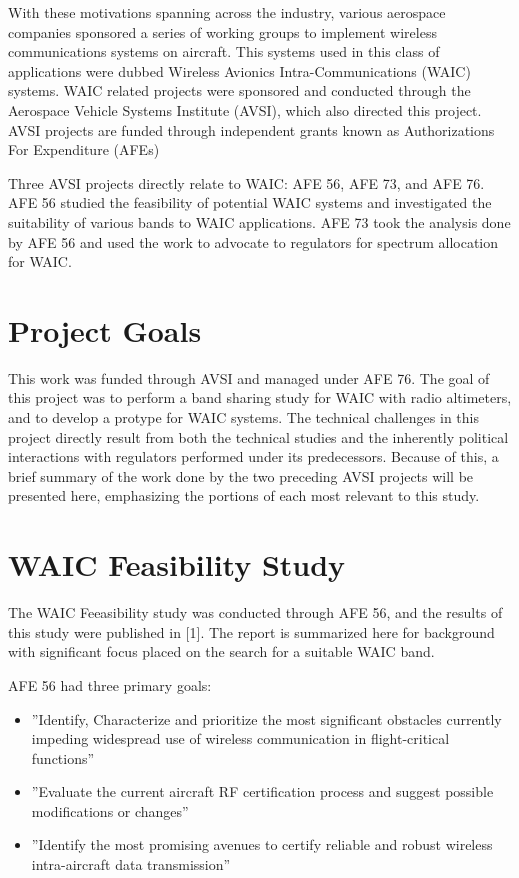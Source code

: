 With these motivations spanning across the industry, various aerospace companies sponsored a series of working groups to implement wireless communications systems on aircraft. This systems used in this class of applications were dubbed Wireless Avionics Intra-Communications (WAIC) systems. WAIC related projects were sponsored and conducted through the Aerospace Vehicle Systems Institute (AVSI), which also directed this project. AVSI projects are funded through independent grants known as Authorizations For Expenditure (AFEs)

Three AVSI projects directly relate to WAIC: AFE 56, AFE 73, and AFE 76. AFE 56 studied the feasibility of potential WAIC systems  and investigated the suitability of various bands to WAIC applications. AFE 73 took the analysis done by AFE 56 and used the work to advocate to regulators for spectrum allocation for WAIC. 

\section{Project Goals}
This work was funded through AVSI and managed under AFE 76. The goal of this project was to perform a band sharing study for WAIC with radio altimeters, and to develop a protype for WAIC systems. The technical challenges in this project directly result from both the technical studies and the inherently political interactions with regulators performed under its predecessors. Because of this, a brief summary of the work done by the two preceding AVSI projects will be presented here, emphasizing the portions of each most relevant to this study. 

\section{WAIC Feasibility Study}
The WAIC Feeasibility study was conducted through AFE 56, and the results of this study were published in [1]. The report is summarized here for background with significant focus placed on the search for a suitable WAIC band. 

AFE 56 had three primary goals: 

\begin{itemize}
\item ''Identify, Characterize and prioritize the most significant obstacles currently impeding widespread use of wireless communication in flight-critical functions''

\item ''Evaluate the current aircraft RF certification process and suggest possible modifications or changes''

\item ''Identify the most promising avenues to certify reliable and robust wireless intra-aircraft data transmission''
\end{itemize}

